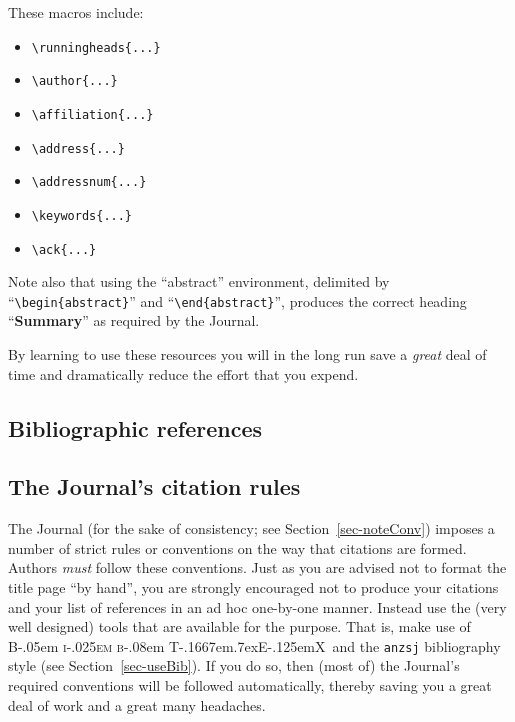 \documentclass[
  times,
  doublespace]{anzsauth}
\providecommand{\tightlist}{%
  \setlength{\itemsep}{0pt}\setlength{\parskip}{0pt}}\usepackage{longtable,booktabs,array}
\newcommand\BibTeX{{\rmfamily B\kern-.05em \textsc{i\kern-.025em b}\kern-.08em
T\kern-.1667em\lower.7ex\hbox{E}\kern-.125emX}}
\begin{document}
These macros include:

\begin{itemize}
\tightlist
\item
  \texttt{\textbackslash{}runningheads\{...\}}
\item
  \texttt{\textbackslash{}author\{...\}}
\item
  \texttt{\textbackslash{}affiliation\{...\}}
\item
  \texttt{\textbackslash{}address\{...\}}
\item
  \texttt{\textbackslash{}addressnum\{...\}}
\item
  \texttt{\textbackslash{}keywords\{...\}}
\item
  \texttt{\textbackslash{}ack\{...\}}
\end{itemize}

Note also that using the ``abstract'' environment, delimited by
``\texttt{\textbackslash{}begin\{abstract\}}'' and
``\texttt{\textbackslash{}end\{abstract\}}'', produces the correct
heading ``\textbf{Summary}'' as required by the Journal.

By learning to use these resources you will in the long run save a
\emph{great} deal of time and dramatically reduce the effort that you
expend.

\subsection{Bibliographic references}\label{sec-bibRef}

\subsection{The Journal's citation rules}\label{sec-citeRules}

The Journal (for the sake of consistency; see
Section~\ref{sec-noteConv}) imposes a number of strict rules or
conventions on the way that citations are formed. Authors \emph{must}
follow these conventions. Just as you are advised not to format the
title page ``by hand'', you are strongly encouraged not to produce your
citations and your list of references in an ad hoc one-by-one manner.
Instead use the (very well designed) tools that are available for the
purpose. That is, make use of \BibTeX~and the \texttt{anzsj}
bibliography style (see Section~\ref{sec-useBib}). If you do so, then
(most of) the Journal's required conventions will be followed
automatically, thereby saving you a great deal of work and a great many
headaches.
\end{document}
